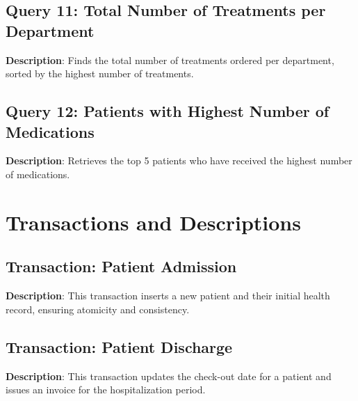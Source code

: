 \documentclass[a4paper,11pt]{article}
\theoremstyle{mytheor}
\begin{document}
\subsection{Query 11: Total Number of Treatments per Department}

\textbf{Description}: Finds the total number of treatments ordered per department, sorted by the highest number of treatments.

\subsection{Query 12: Patients with Highest Number of Medications}

\textbf{Description}: Retrieves the top 5 patients who have received the highest number of medications.

\section{Transactions and Descriptions}
\subsection{Transaction: Patient Admission}

\textbf{Description}: This transaction inserts a new patient and their initial health record, ensuring atomicity and consistency.

\subsection{Transaction: Patient Discharge}

\textbf{Description}: This transaction updates the check-out date for a patient and issues an invoice for the hospitalization period.
\end{document}
